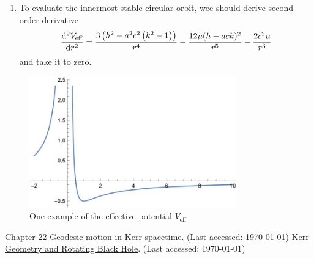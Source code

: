 \documentclass[a4paper,pdftex,10pt]{article}
\begin{document}
\begin{enumerate}
        \item 
        To evaluate the innermost stable circular orbit, wee should derive second order derivative 
        \begin{equation}
          \dv[2]{V_{\textrm{eff}}}{r}
          =
          \frac{3 \left(h^2-a^2 c^2 \left(k^2-1\right)\right)}{r^4}-\frac{12\mu(h-a c k)^2}{r^5}-\frac{2 c^2 \mu }{r^3}
        \end{equation}
        and take it to zero.




\end{enumerate}

\begin{figure}
  \centering
  \includegraphics[width=0.8\textwidth]{fig/Veff.jpg}
  \caption{One example of the effective potential $V_{\textrm{eff}}$}
\end{figure}


\begin{thebibliography}{99}
  \href{https://www.roma1.infn.it/teongrav/onde19_20/geodetiche_Kerr.pdf}{Chapter 22 Geodesic motion in Kerr spacetime}. (Last accessed: \today)
  \href{https://www.pas.rochester.edu/assets/pdf/undergraduate/kerr_geometry_and_rotating_black_holes.pdf}{Kerr Geometry and Rotating Black Hole}. (Last accessed: \today)
\end{thebibliography}












% 
% 

\end{document}
